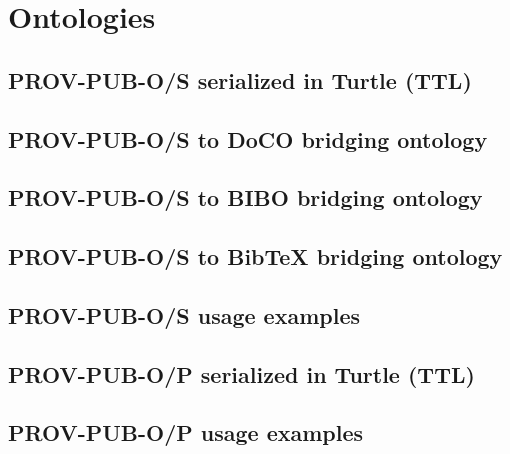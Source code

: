 \chapter{Ontologies}
\label{ch:ontologies}
\section{PROV-PUB-O/S serialized in Turtle (TTL)}

\section{PROV-PUB-O/S to DoCO bridging ontology}

\section{PROV-PUB-O/S to BIBO bridging ontology}

\section{PROV-PUB-O/S to BibTeX bridging ontology}

\section{PROV-PUB-O/S usage examples}

\section{PROV-PUB-O/P serialized in Turtle (TTL)}

\section{PROV-PUB-O/P usage examples}


